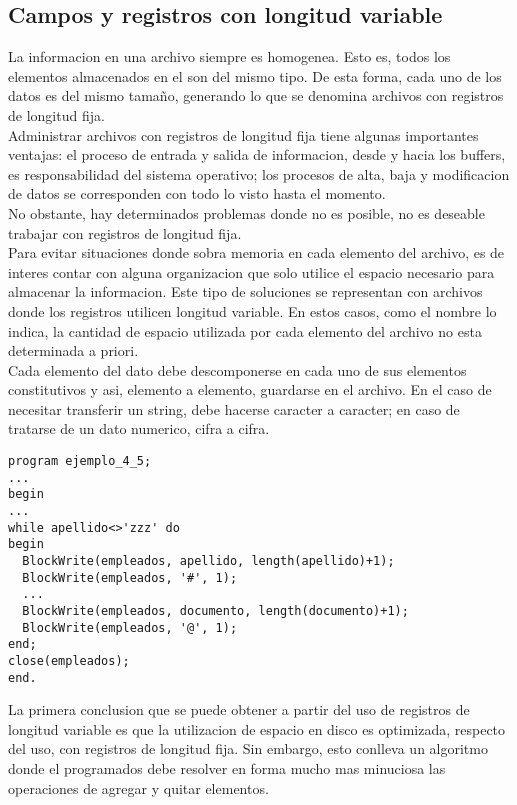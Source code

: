\subsection{Campos y registros con longitud variable}
La informacion en una archivo siempre es homogenea. Esto es, todos los elementos almacenados en el son del mismo tipo. De esta forma, cada uno de los datos es del mismo tamaño, generando lo que se denomina archivos con registros de longitud fija.\\
Administrar archivos con registros de longitud fija tiene algunas importantes ventajas: el proceso de entrada y salida de informacion, desde y hacia los buffers, es responsabilidad del sistema operativo; los procesos de alta, baja y modificacion de datos se corresponden con todo lo visto hasta el momento.\\
No obstante, hay determinados problemas donde no es posible, no es deseable trabajar con registros de longitud fija. \\
Para evitar situaciones donde sobra memoria en cada elemento del archivo, es de interes contar con alguna organizacion que solo utilice el espacio necesario para almacenar la informacion. Este tipo de soluciones se representan con archivos donde los registros utilicen longitud variable. En estos casos, como el nombre lo indica, la cantidad de espacio utilizada por cada elemento del archivo no esta determinada a priori.\\
Cada elemento del dato debe descomponerse en cada uno de sus elementos constitutivos y asi, elemento a elemento, guardarse en el archivo. En el caso de necesitar transferir un string, debe hacerse caracter a caracter; en caso de tratarse de un dato numerico, cifra a cifra.

\begin{lstlisting}
program ejemplo_4_5;
...
begin
...
while apellido<>'zzz' do
begin
  BlockWrite(empleados, apellido, length(apellido)+1);
  BlockWrite(empleados, '#', 1);
  ...
  BlockWrite(empleados, documento, length(documento)+1);
  BlockWrite(empleados, '@', 1);
end;
close(empleados);
end.
\end{lstlisting}

La primera conclusion que se puede obtener a partir del uso de registros de longitud variable es que la utilizacion de espacio en disco es optimizada, respecto del uso, con registros de longitud fija. Sin embargo, esto conlleva un algoritmo donde el programados debe resolver en forma mucho mas minuciosa las operaciones de agregar y quitar elementos.

